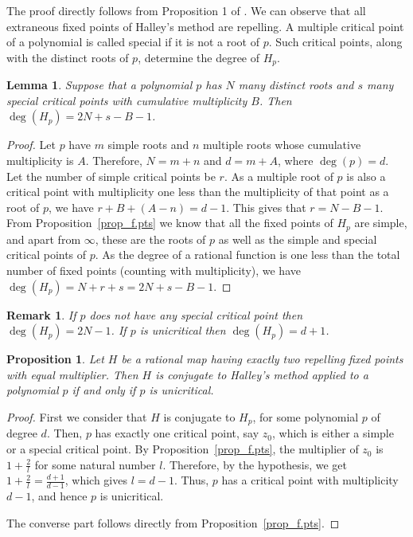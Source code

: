 \documentclass[12pt]{article}
\newtheorem{lem}{Lemma}[section]
\newtheorem{prop}{Proposition}[section]
\newtheorem{rem}{Remark}[section]
\begin{document}
The proof directly follows from Proposition 1 of \cite{BH2003}. We can observe that all extraneous fixed points of Halley's method are repelling.
A multiple critical point of a polynomial is called special if it is not a root of $p$. Such critical points, along with the distinct roots of $p$, determine the degree of $H_p$.
\begin{lem}
Suppose that a polynomial $p$ has $N$ many distinct roots and $s$ many special critical points with cumulative multiplicity $B$. Then $\deg(H_p)=2N+s-B-1$.
\end{lem}
\begin{proof}
Let $p$ have $m$ simple roots and $n$ multiple roots whose cumulative multiplicity is $A$. Therefore, $N=m+n$ and $d=m+A$, where $\deg(p)=d$. Let the number of simple critical points be $r$. As a multiple root of $p$ is also a critical point with multiplicity one less than the multiplicity of that point as a root of $p$, we have $r+B+(A-n)=d-1$. This gives that $r=N-B-1$. From Proposition~\ref{prop_f.pts} we know that all the fixed points of $H_p$ are simple, and apart from $\infty$, these are the roots of $p$ as well as the simple and special critical points of $p$. As the degree of a rational function is one less than the total number of fixed points (counting with multiplicity), we have $\deg(H_p)=N+r+s=2N+s-B-1$.
\end{proof}
\begin{rem}
If $p$ does not have any special critical point then $\deg(H_p)=2N-1$. If $p$ is unicritical then $\deg(H_p)=d+1$.
\end{rem}
\begin{prop}\label{ext_two}
Let $H$ be a rational map having exactly two repelling fixed points with equal multiplier. Then $H$ is conjugate to Halley's method applied to a polynomial $p$ if and only if $p$ is unicritical.
\end{prop}
\begin{proof}
First we consider that $H$ is conjugate to $H_p$, for some polynomial $p$ of degree $d$. Then, $p$ has exactly one critical point, say $z_0$, which is either a simple or a special critical point. By Proposition~\ref{prop_f.pts}, the multiplier of $z_0$ is $1+\frac{2}{l}$ for some natural number $l$. Therefore, by the hypothesis, we get $1+\frac{2}{l}=\frac{d+1}{d-1}$, which gives $l=d-1$. Thus, $p$ has a critical point with multiplicity $d-1$, and hence $p$ is unicritical.
\par
The converse part follows directly from Proposition~\ref{prop_f.pts}.
\end{proof}
\end{document}
